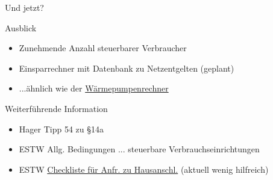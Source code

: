 \begin{frame}{Und jetzt?}
   \begin{block}{Ausblick}
      \begin{itemize}
         \item Zunehmende Anzahl steuerbarer Verbraucher
         \item Einsparrechner mit Datenbank zu Netzentgelten (geplant)
         \item ...ähnlich wie der \href{https://waermepumpenrechner.streamlit.app/}{Wärmepumpenrechner}
      \end{itemize}
   \end{block}

   \vspace{0.5cm}
   \begin{block}{Weiterführende Information}
      \begin{itemize}
         \item Hager Tipp 54\cite{HagerTipp54_2024} zu §14a
         \item ESTW Allg. Bedingungen ... steuerbare Verbrauchseinrichtungen\cite{ESTW2024AllgBedstVEP14a}
         \item ESTW \href{https://netze.estw.de/de/Checkliste-fuer-Anfragen-zu-Hausanschluessen/Checkliste-fuer-Anfragen-zu-Hausanschluessen.html}{Checkliste für Anfr. zu Hausanschl.} (aktuell wenig hilfreich)
      \end{itemize}
   \end{block}
\end{frame}


